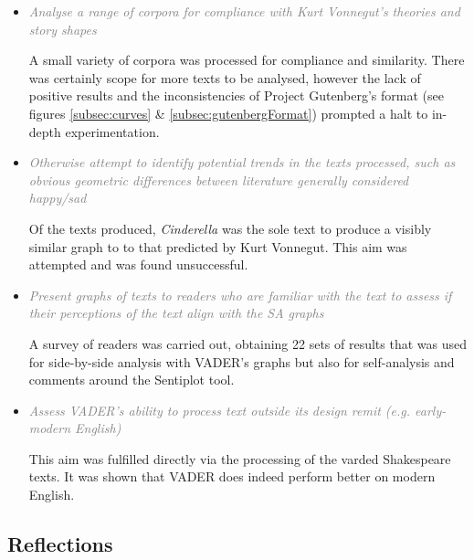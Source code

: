 \documentclass{article}
\begin{document}
{\begin{itemize}
            The Sentiplot tool functionally fulfilled this aim acceptably. It is able to parse text in a small number of formats, pre-process it and hand it to VADER such that the results may be plotted on a set of axes. And it successfully facilitated the experimentation present in this report.

            \item \textcolor{gray}{\textit{Analyse a range of corpora for compliance with Kurt Vonnegut’s theories and story shapes}}
            
            A small variety of corpora was processed for compliance and similarity. There was certainly scope for more texts to be analysed, however the lack of positive results and the inconsistencies of Project Gutenberg's format (see figures \ref{subsec:curves} \& \ref{subsec:gutenbergFormat}) prompted a halt to in-depth experimentation.
            \item \textcolor{gray}{\textit{Otherwise attempt to identify potential trends in the texts processed, such as obvious geometric differences between literature generally considered happy/sad}}
            
            Of the texts produced, \textit{Cinderella} was the sole text to produce a visibly similar graph to to that predicted by Kurt Vonnegut. This aim was attempted and was found unsuccessful.
            \item \textcolor{gray}{\textit{Present graphs of texts to readers who are familiar with the text to assess if their perceptions of the text align with the SA graphs}}
            
            A survey of readers was carried out, obtaining 22 sets of results that was used for side-by-side analysis with VADER's graphs but also for self-analysis and comments around the Sentiplot tool.
            \item \textcolor{gray}{\textit{Assess VADER's ability to process text outside its design remit (e.g. early-modern English)}}
            
            This aim was fulfilled directly via the processing of the varded Shakespeare texts. It was shown that VADER does indeed perform better on modern English.
        \end{itemize}
    \subsection{Reflections}
}
\end{document}
